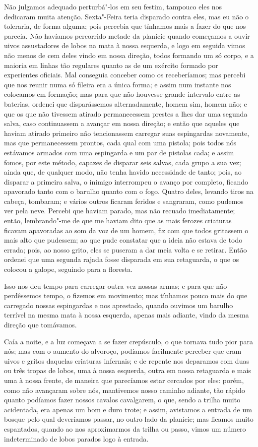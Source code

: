 Não julgamos adequado perturbá"-los em seu festim, tampouco eles nos
dedicaram muita atenção. Sexta"-Feira teria disparado contra eles, mas eu
não o toleraria, de forma alguma; pois percebia que tínhamos mais a
fazer do que nos parecia. Não havíamos percorrido metade da planície
quando começamos a ouvir uivos assustadores de lobos na mata à nossa
esquerda, e logo em seguida vimos não menos de cem deles vindo em nossa
direção, todos formando um só corpo, e a maioria em linhas tão regulares
quanto as de um exército formado por experientes oficiais. Mal conseguia
conceber como os receberíamos; mas percebi que nos reunir numa só
fileira era a única forma; e assim num instante nos colocamos em
formação; mas para que não houvesse grande intervalo entre as baterias,
ordenei que disparássemos alternadamente, homem sim, homem não; e que os
que não tivessem atirado permanecessem prestes a lhes dar uma segunda
salva, caso continuassem a avançar em nossa direção; e então que aqueles
que haviam atirado primeiro não tencionassem carregar suas espingardas
novamente, mas que permanecessem prontos, cada qual com uma pistola;
pois todos nós estávamos armados com uma espingarda e um par de pistolas
cada; e assim fomos, por este método, capazes de disparar seis salvas,
cada grupo a sua vez; ainda que, de qualquer modo, não tenha havido
necessidade de tanto; pois, ao disparar a primeira salva, o inimigo
interrompeu o avanço por completo, ficando apavorado tanto com o barulho
quanto com o fogo. Quatro deles, levando tiros na cabeça, tombaram; e
vários outros ficaram feridos e sangraram, como pudemos ver pela neve.
Percebi que haviam parado, mas não recuado imediatamente; então,
lembrando"-me de que me haviam dito que as mais ferozes criaturas ficavam
apavoradas ao som da voz de um homem, fiz com que todos gritassem o mais
alto que pudessem; ao que pude constatar que a ideia não estava de todo
errada; pois, ao nosso grito, eles se puseram a dar meia volta e se
retirar. Então ordenei que uma segunda rajada fosse disparada em sua
retaguarda, o que os colocou a galope, seguindo para a floresta.

Isso nos deu tempo para carregar outra vez nossas armas; e para que não
perdêssemos tempo, o fizemos em movimento; mas tínhamos pouco mais do
que carregado nossas espingardas e nos aprestado, quando ouvimos um
barulho terrível na mesma mata à nossa esquerda, apenas mais adiante,
vindo da mesma direção que tomávamos.

Caía a noite, e a luz começava a se fazer crepúsculo, o que tornava tudo
pior para nós; mas com o aumento do alvoroço, podíamos facilmente
perceber que eram uivos e gritos daquelas criaturas infernais; e de
repente nos deparamos com duas ou três tropas de lobos, uma à nossa
esquerda, outra em nossa retaguarda e mais uma à nossa frente, de
maneira que parecíamos estar cercados por eles: porém, como não
avançaram sobre nós, mantivemos nosso caminho adiante, tão rápido quanto
podíamos fazer nossos cavalos cavalgarem, o que, sendo a trilha muito
acidentada, era apenas um bom e duro trote; e assim, avistamos a entrada
de um bosque pelo qual deveríamos passar, no outro lado da planície; mas
ficamos muito espantados, quando ao nos aproximarmos da trilha ou passo,
vimos um número indeterminado de lobos parados logo à entrada.

